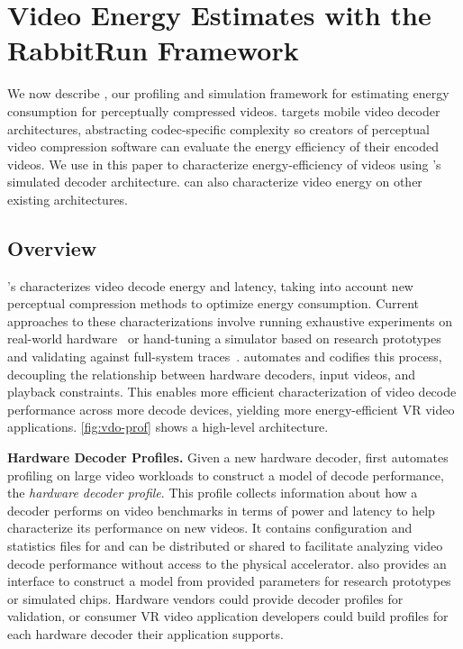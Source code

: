 \section{Video Energy Estimates with the RabbitRun Framework}
\label{sec:vdoprof}

We now describe \nameArchprof, our profiling and simulation framework for estimating energy consumption for perceptually compressed videos.
\nameArchprof targets mobile video decoder architectures, abstracting codec-specific complexity so creators of perceptual video compression software can evaluate the energy efficiency of their encoded videos.
We use \nameArchprof in this paper to characterize energy-efficiency of videos using \nameArch's simulated decoder architecture. \nameArchprof can also characterize video energy on other existing architectures.

\subsection{\nameArchprof Overview}
\nameArchprof's characterizes video decode energy and latency, taking into account new perceptual compression methods to optimize energy consumption.
Current approaches to these characterizations involve running exhaustive experiments on real-world hardware~\cite{evr19isca} or hand-tuning a simulator based on research prototypes and validating against full-system traces~\cite{zhang2017race}.
\nameArchprof automates and codifies this process, decoupling the relationship between hardware decoders, input videos, and playback constraints.
This enables more efficient characterization of video decode performance across more decode devices, yielding more energy-efficient VR video applications.
\ref{fig:vdo-prof} shows a high-level \nameArchprof architecture.

\vdoprofOverview

\textbf{\nameArchprof Hardware Decoder Profiles. } Given a new hardware decoder, \nameArchprof first automates profiling on large video workloads to construct a model of decode performance, the \emph{hardware decoder profile}.
This profile collects information about how a decoder performs on video benchmarks in terms of power and latency to help characterize its performance on new videos.
It contains configuration and statistics files for \nameArchprof and can be distributed or shared to facilitate analyzing video decode performance without access to the physical accelerator.
\nameArchprof also provides an interface to construct a model from provided parameters for research prototypes or simulated chips.
Hardware vendors could provide \nameArchprof decoder profiles for validation, or consumer VR video application developers could build profiles for each hardware decoder their application supports.

